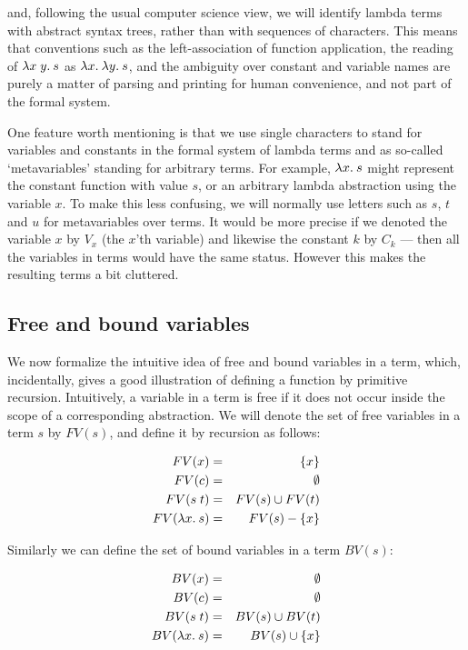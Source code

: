 \noindent and, following the usual computer science view, we will identify
lambda terms with abstract syntax trees, rather than with sequences of
characters. This means that conventions such as the left-association of
function application, the reading of $\lambda x\;y.\: s$ as $\lambda x.\: \lambda y.\: s$,
and the ambiguity over constant and variable names are purely a matter of
parsing and printing for human convenience, and not part of the formal system.

One feature worth mentioning is that we use single characters to stand for
variables and constants in the formal system of lambda terms {\em} and as
so-called `metavariables' standing for arbitrary terms. For example, $\lambda x.\:
s$ might represent the constant function with value $s$, or an arbitrary lambda
abstraction using the variable $x$. To make this less confusing, we will
normally use letters such as $s$, $t$ and $u$ for metavariables over terms. It
would be more precise if we denoted the variable $x$ by $V_x$ (the $x$'th
variable) and likewise the constant $k$ by $C_k$ --- then all the variables in
terms would have the same status. However this makes the resulting terms a bit
cluttered.

\subsection{Free and bound variables}

We now formalize the intuitive idea of free and bound variables in a
term, which, incidentally, gives a good illustration of defining a
function by primitive recursion. Intuitively, a variable in a term is
free if it does not occur inside the scope of a corresponding abstraction. We
will denote the set of free variables in a term $s$ by $FV(s)$, and
define it by recursion as follows:

\begin{eqnarray*}
   FV(x)          & = & \{ x \}                 \\
   FV(c)          & = & \emptyset               \\
   FV(s\; t)      & = & FV(s) \cup FV(t)      \\
   FV(\lambda x.\: s) & = & FV(s) - \{ x \}
\end{eqnarray*}

\noindent Similarly we can define the set of bound variables in a term $BV(s)$:

\begin{eqnarray*}
   BV(x)          & = & \emptyset               \\
   BV(c)          & = & \emptyset               \\
   BV(s\; t)      & = & BV(s) \cup BV(t)      \\
   BV(\lambda x.\: s) & = & BV(s) \cup \{ x \}
\end{eqnarray*}

